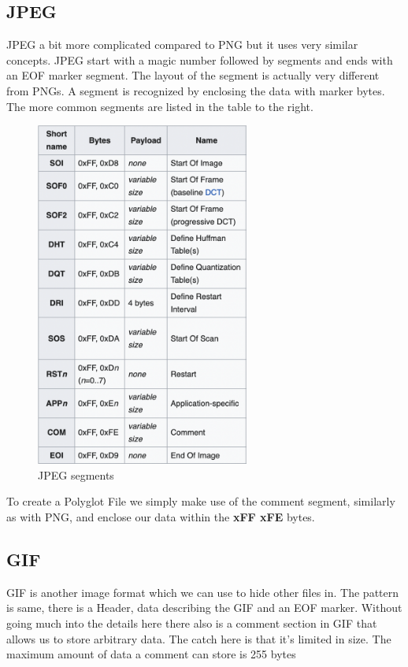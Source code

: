 \subsection{JPEG}

JPEG a bit more complicated compared to PNG but it uses very similar concepts. JPEG start with a magic number followed by segments and ends with an
EOF marker segment. The layout of the segment is actually very different from PNGs. A segment is recognized by enclosing the data with marker bytes. The
more common segments are listed in the table to the right.

\begin{figure}[h]
    \center
    \includegraphics[width=7cm]{images/jpeg.png}
    \caption{JPEG segments\cite{jpeg}}
\end{figure}

To create a Polyglot File we simply make use of the comment segment, similarly as with PNG, and enclose our data within the \textbf{xFF xFE} bytes.

\subsection{GIF}

GIF is another image format which we can use to hide other files in. The pattern is same, there is a Header, data describing the
GIF and an EOF marker. Without going much into the details here there also is a comment section in GIF that allows us to store arbitrary
data. The catch here is that it's limited in size. The maximum amount of data a comment can store is 255 bytes \cite{gif}

